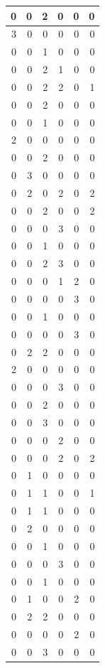 \documentclass[
]{article}
\begin{document}
\begin{tabular}{r|r|r|r|r|r}
\hline
0 & 0 & 2 & 0 & 0 & 0\\
\hline
3 & 0 & 0 & 0 & 0 & 0\\
\hline
0 & 0 & 1 & 0 & 0 & 0\\
\hline
0 & 0 & 2 & 1 & 0 & 0\\
\hline
0 & 0 & 2 & 2 & 0 & 1\\
\hline
0 & 0 & 2 & 0 & 0 & 0\\
\hline
0 & 0 & 1 & 0 & 0 & 0\\
\hline
2 & 0 & 0 & 0 & 0 & 0\\
\hline
0 & 0 & 2 & 0 & 0 & 0\\
\hline
0 & 3 & 0 & 0 & 0 & 0\\
\hline
0 & 2 & 0 & 2 & 0 & 2\\
\hline
0 & 0 & 2 & 0 & 0 & 2\\
\hline
0 & 0 & 0 & 3 & 0 & 0\\
\hline
0 & 0 & 1 & 0 & 0 & 0\\
\hline
0 & 0 & 2 & 3 & 0 & 0\\
\hline
0 & 0 & 0 & 1 & 2 & 0\\
\hline
0 & 0 & 0 & 0 & 3 & 0\\
\hline
0 & 0 & 1 & 0 & 0 & 0\\
\hline
0 & 0 & 0 & 0 & 3 & 0\\
\hline
0 & 2 & 2 & 0 & 0 & 0\\
\hline
2 & 0 & 0 & 0 & 0 & 0\\
\hline
0 & 0 & 0 & 3 & 0 & 0\\
\hline
0 & 0 & 2 & 0 & 0 & 0\\
\hline
0 & 0 & 3 & 0 & 0 & 0\\
\hline
0 & 0 & 0 & 2 & 0 & 0\\
\hline
0 & 0 & 0 & 2 & 0 & 2\\
\hline
0 & 1 & 0 & 0 & 0 & 0\\
\hline
0 & 1 & 1 & 0 & 0 & 1\\
\hline
0 & 1 & 1 & 0 & 0 & 0\\
\hline
0 & 2 & 0 & 0 & 0 & 0\\
\hline
0 & 0 & 1 & 0 & 0 & 0\\
\hline
0 & 0 & 0 & 3 & 0 & 0\\
\hline
0 & 0 & 1 & 0 & 0 & 0\\
\hline
0 & 1 & 0 & 0 & 2 & 0\\
\hline
0 & 2 & 2 & 0 & 0 & 0\\
\hline
0 & 0 & 0 & 0 & 2 & 0\\
\hline
0 & 0 & 3 & 0 & 0 & 0\\

\end{tabular}
\end{document}
